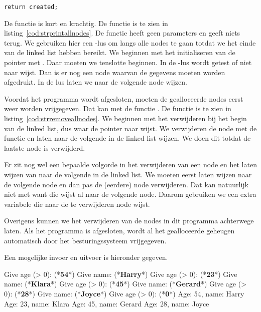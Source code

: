 \begin{lstlisting}[style=lstoneline]
return created;
\end{lstlisting}

De functie  is kort en krachtig. De functie is te zien in listing~\ref{cod:strprintallnodes}. De functie heeft geen parameters en geeft niets terug.  We gebruiken hier een -lus om langs alle nodes te gaan totdat we het einde van de linked list hebben bereikt. We beginnen met het initialiseren van de pointer  met . Daar moeten we tenslotte beginnen. In de -lus wordt getest of  niet naar  wijst. Dan is er nog een node waarvan de gegevens moeten worden afgedrukt. In de lus laten we  naar de volgende node wijzen. 


Voordat het programma wordt afgesloten, moeten de gealloceerde nodes eerst weer worden vrijgegeven. Dat kan met de functie . De functie is te zien in listing~\ref{cod:strremoveallnodes}. We beginnen met het verwijderen bij het begin van de linked list, dus waar de pointer  naar wijst. We verwijderen de node met de functie  en laten  naar de volgende in de linked list wijzen. We doen dit totdat de laatste node is verwijderd.

Er zit nog wel een bepaalde volgorde in het verwijderen van een node en het laten wijzen van  naar de volgende in de linked list. We moeten  eerst laten wijzen naar de volgende node en dan pas de (eerdere) node verwijderen. Dat kan natuurlijk niet met  want die wijst al naar de volgende node. Daarom gebruiken we een extra variabele  die naar de te verwijderen node wijst.


Overigens kunnen we het verwijderen van de nodes in dit programma achterwege laten. Als het programma is afgesloten, wordt al het gealloceerde geheugen automatisch door het besturingssysteem vrijgegeven.

Een mogelijke invoer en uitvoer is hieronder gegeven.

\begin{dosbox}[title=Mogelijke invoer en uitvoer van het programma.]
Give age (> 0): (*\textbf{54}*)
Give name: (*\textbf{Harry}*)
Give age (> 0): (*\textbf{23}*)
Give name: (*\textbf{Klara}*)
Give age (> 0): (*\textbf{45}*)
Give name: (*\textbf{Gerard}*)
Give age (> 0): (*\textbf{28}*)
Give name: (*\textbf{Joyce}*)
Give age (> 0): (*\textbf{0}*)
Age: 54, name: Harry
Age: 23, name: Klara
Age: 45, name: Gerard
Age: 28, name: Joyce
\end{dosbox}

